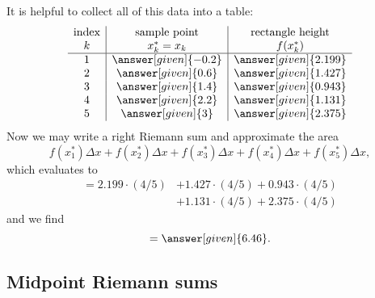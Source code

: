 \documentclass{ximera}
\begin{document}
\begin{example}
\begin{explanation}
\begin{image}
\end{image}
It is helpful to collect all of this data into a table:
\[
\begin{array}{c|c|c}
\text{index}&\text{sample point}&\text{rectangle height}\\
  k &  x^*_k=x_k & f(x^*_k) \\ \hline
  1 &  \answer[given]{-0.2}      & \answer[given]{2.199}   \\
  2 &  \answer[given]{0.6}       & \answer[given]{1.427}   \\
  3 &  \answer[given]{1.4}       & \answer[given]{0.943}   \\
  4 &  \answer[given]{2.2}       & \answer[given]{1.131}   \\
  5 & \answer[given]{3}         & \answer[given]{2.375}   \\
\end{array}
\]
Now we may write a right Riemann sum and approximate the area
\[
f(x_1^*)\Delta x +  f(x_2^*)\Delta x +   f(x_3^*)\Delta x +f(x_4^*)\Delta x+   f(x_5^*)\Delta x,
\]
which evaluates to
\begin{align*}
  = 2.199 \cdot (4/5) &+ 1.427  \cdot(4/5) + 0.943  \cdot(4/5)\\
  &+ 1.131  \cdot(4/5) + 2.375  \cdot(4/5)
\end{align*}
and we find
\[
  = \answer[given]{6.46}.
\]
  \end{explanation}
\end{example}




\subsection{Midpoint Riemann sums}
\end{document}
